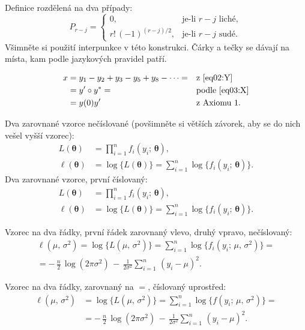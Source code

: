 Definice rozdělená na dva případy:
\[
P_{r-j}=
\begin{cases}
0, & \text{je-li $r-j$ liché},\\
r!\,(-1)^{(r-j)/2}, & \text{je-li $r-j$ sudé}.
\end{cases}
\]
Všimněte si použití interpunkce v této konstrukci. Čárky a tečky se
dávají na místa, kam podle jazykových pravidel patří.

\begin{align}
x& = y_1-y_2+y_3-y_5+y_8-\dots = && \text{z \eqref{eq02:Y}} \nonumber\\
& = y'\circ y^* = && \text{podle \eqref{eq03:X}} \nonumber\\
& = y(0) y' && \text {z Axiomu 1.}
\end{align}


Dva zarovnané vzorce nečíslované (povšimněte si větších závorek, aby se do nich
vešel vyšší vzorec):
\begin{align*}
L(\bm\theta) &= \prod_{i=1}^n f_i(y_i;\,\bm\theta), \\
\ell(\bm\theta) &= \log\bigl\{L(\bm\theta)\bigr\} =
\sum_{i=1}^n \log\bigl\{f_i(y_i;\,\bm\theta)\bigr\}.
\end{align*}
Dva zarovnané vzorce, první číslovaný:
\begin{align}
L(\bm\theta) &= \prod_{i=1}^n f_i(y_i;\,\bm\theta), \label{eq01:L} \\
\ell(\bm\theta) &= \log\bigl\{L(\bm\theta)\bigr\} =
\sum_{i=1}^n \log\bigl\{f_i(y_i;\,\bm\theta)\bigr\}. \nonumber
\end{align}

Vzorec na dva řádky, první řádek zarovnaný vlevo, druhý vpravo, nečíslovaný:
\begin{multline*}
\ell(\mu,\,\sigma^2) = \log\bigl\{L(\mu,\,\sigma^2)\bigr\} =
\sum_{i=1}^n \log\bigl\{f_i(y_i;\,\mu,\,\sigma^2)\bigr\}= \\
  = -\,\frac{n}{2}\,\log(2\pi\sigma^2) \,-\,
\frac{1}{2\sigma^2}\sum_{i=1}^n\,(y_i - \mu)^2.
\end{multline*}

Vzorec na dva řádky, zarovnaný na $=$, číslovaný uprostřed:
\begin{equation}\label{eq01:ell}
\begin{split}
\ell(\mu,\,\sigma^2) &= \log\bigl\{L(\mu,\,\sigma^2)\bigr\} =
\sum_{i=1}^n \log\bigl\{f(y_i;\,\mu,\,\sigma^2)\bigr\}= \\
& = -\,\frac{n}{2}\,\log(2\pi\sigma^2) \,-\,
\frac{1}{2\sigma^2}\sum_{i=1}^n\,(y_i - \mu)^2.
\end{split}
\end{equation}

